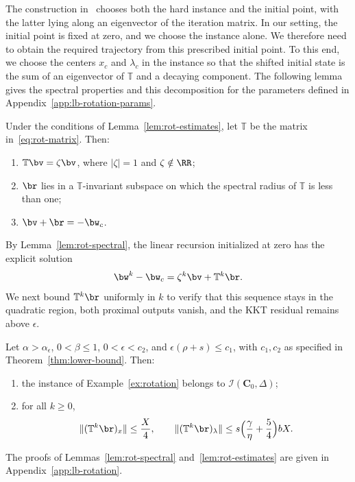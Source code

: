The construction in~\cite[Section~5.1.1]{li2026smoothing} chooses both the
hard instance and the initial point, with the latter lying along an
eigenvector of the iteration matrix. In our setting, the initial point is
fixed at zero, and we choose the instance alone. We therefore need to
obtain the required trajectory from this prescribed initial point. To this
end, we choose the centers \(x_c\) and \(\lambda_c\) in the instance so that
the shifted initial state is the sum of an eigenvector of \(\mathbb T\)
and a decaying component. The following lemma gives the spectral
properties and this decomposition for the parameters defined
in Appendix~\ref{app:lb-rotation-params}.

\begin{lemma}
\label{lem:rot-spectral}
Under the conditions of Lemma~\ref{lem:rot-estimates}, let
\(\mathbb T\) be the matrix in~\eqref{eq:rot-matrix}. Then:
\begin{enumerate}[label=(\roman*)]
\item \(\mathbb T\bv=\zeta\bv\), where \(|\zeta|=1\) and \(\zeta\notin\RR\);
\item \(\br\) lies in a \(\mathbb T\)-invariant subspace on which the spectral
  radius of \(\mathbb T\) is less than one;
\item \(\bv+\br=-\bw_c\).
\end{enumerate}
\end{lemma}
 
By Lemma~\ref{lem:rot-spectral}, the linear recursion initialized at zero
has the explicit solution
\[
\bw^k-\bw_c=\zeta^k\bv+\mathbb T^k\br.
\]
We next bound \(\mathbb T^k\br\) uniformly in \(k\) to verify that this
sequence stays in the quadratic region, both proximal outputs vanish,
and the KKT residual remains above \(\epsilon\).

\begin{lemma}
\label{lem:rot-estimates}
Let \(\alpha>\alpha_\epsilon\), \(0<\beta\le1\), \(0<\epsilon<c_2\), and
\(\epsilon(\rho+s)\le c_1\), with \(c_1,c_2\) as specified in
Theorem~\ref{thm:lower-bound}. Then:
\begin{enumerate}[label=(\roman*)]
\item the instance of Example~\ref{ex:rotation} belongs to
  \(\mathcal I(\mathbf C_0,\Delta)\);
\item for all \(k\ge0\),
\[
\|(\mathbb T^k\br)_x\|\le\frac X4,
\qquad
\|(\mathbb T^k\br)_\lambda\|\le
s\Bigl(\frac{\gamma}{\eta}+\frac54\Bigr)bX.
\]
\end{enumerate}
\end{lemma}
The proofs of Lemmas~\ref{lem:rot-spectral} and~\ref{lem:rot-estimates} are
given in Appendix~\ref{app:lb-rotation}.

